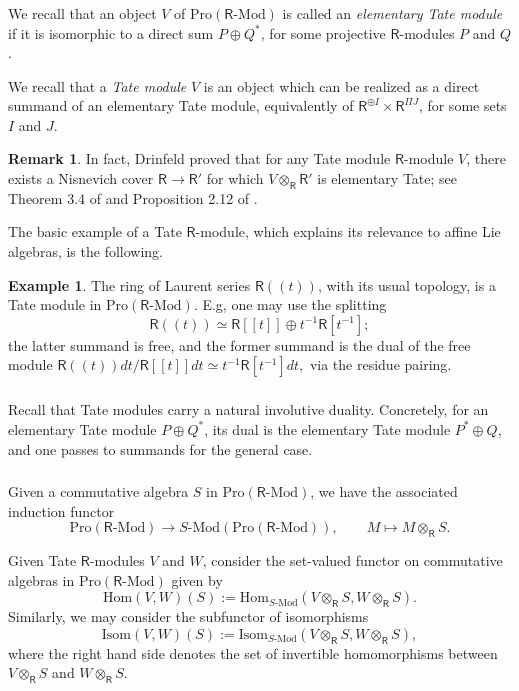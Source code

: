 \documentclass{amsart}
\theoremstyle{definition}
\newtheorem{Ex}[Thm]{Example}
\newtheorem{Rem}[Thm]{Remark}
\newcommand{\Pro}{\on{Pro}}
\newcommand{\sss}{\subsubsection{}}
\newcommand{\Hom}{\on{Hom}}
\renewcommand{\mod}{\text{-}\on{Mod}}
\newcommand{\on}{\mathrm}
\newcommand{\Ring}{\mathsf{R}}
\numberwithin{equation}{section}
\begin{document}
\sss We recall that an object $V$ of $\Pro(\Ring\mod)$ is called an {\em elementary Tate module} if it is  isomorphic to a direct sum $P \oplus Q^*$, for some projective $\Ring$-modules $P$ and $Q$. 



We recall that a {\em Tate module} $V$ is an object which can be realized as a  direct summand of an elementary Tate module, equivalently of $\Ring^{\oplus I} \times \Ring^{\Pi J}$, for some sets $I$ and $J$. 


\begin{Rem} In fact,  Drinfeld proved that for any Tate module $\Ring$-module $V$, there exists a Nisnevich cover $\Ring \rightarrow \Ring'$ for which $V  \otimes_\Ring \Ring'$ is elementary Tate; see Theorem 3.4 of \cite{DrInf} and Proposition 2.12 of \cite{BBE}. \end{Rem}

The basic example of a Tate $\Ring$-module, which explains its relevance to affine Lie algebras, is the following. 

\begin{Ex} The ring of Laurent series $\Ring(\!(t)\!)$, with its usual topology, is a Tate module in $\Pro(\Ring\mod)$. E.g, one may use the splitting 
  $$\Ring(\!(t)\!) \simeq \Ring[[t]] \oplus t^{-1} \Ring[t^{-1}];$$the latter summand is free, and the former summand is the dual of the free module $\Ring(\!(t)\!)dt/\Ring[[t]]dt \simeq t^{-1}\Ring[t^{-1}]dt,$ via the residue pairing.   
\end{Ex}

\sss \label{sss:tateduality}Recall that Tate modules carry a natural involutive duality. Concretely, for an elementary Tate module $P \oplus Q^*$, its dual is the elementary Tate module $P^* \oplus Q$, and one passes to summands for the general case. 


\sss Given a commutative algebra $S$ in $\on{Pro}(\Ring\mod)$, we have the associated induction functor
$$\Pro(\Ring\mod) \rightarrow S\mod(\Pro(\Ring\mod)), \quad \quad  M \mapsto M \otimes_{\Ring} S. $$
 

Given Tate $\Ring$-modules $V$ and $W$, consider the set-valued functor on commutative algebras in $\on{Pro}(\Ring\mod)$ given by
$$\Hom(V,W)(S) := \Hom_{S\mod}( V \otimes_{\Ring} S, W \otimes_{\Ring}  S).$$
Similarly, we may consider the subfunctor of isomorphisms
$$\on{Isom}(V,W)(S) := \on{Isom}_{S\mod}(V \otimes_{\Ring} S, W \otimes_{\Ring} S),$$where the right hand side denotes the set of invertible homomorphisms between $V \otimes_{\Ring} S$ and $W \otimes_{\Ring} S$. 
\end{document}
